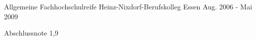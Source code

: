 

\begin{cventries}

  \cventry
    {Allgemeine Fachhochschulreife} %
    {Heinz-Nixdorf-Berufskolleg} %
    {Essen} %
    {Aug. 2006 - Mai 2009} %
    {
      \begin{cvitems} %
        \item {Abschlussnote 1,9}
      \end{cvitems}
    }

\end{cventries}
